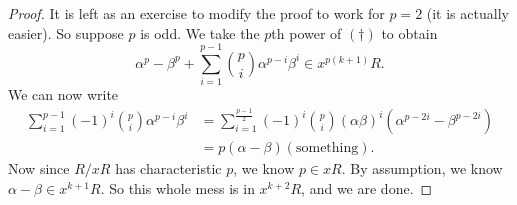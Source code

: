 \documentclass[a4paper]{article}
\begin{document}
\begin{proof}
  It is left as an exercise to modify the proof to work for $p = 2$ (it is actually easier). So suppose $p$ is odd. We take the $p$th power of $(\dagger)$ to obtain
  \[
    \alpha^p - \beta^p + \sum_{i = 1}^{p - 1} \binom{p}{i} \alpha^{p - i} \beta^i \in x^{p(k + 1)}R.
  \]
  We can now write
  \begin{align*}
    \sum_{i = 1}^{p - 1} (-1)^i\binom{p}{i} \alpha^{p - i} \beta^i &= \sum_{i = 1}^{\frac{p - 1}{2}} (-1)^i\binom{p}{i} (\alpha \beta)^i \left(\alpha^{p - 2i} - \beta^{p - 2i}\right)\\
    &= p (\alpha - \beta) (\text{something}).
  \end{align*}
  Now since $R/xR$ has characteristic $p$, we know $p \in xR$. By assumption, we know $\alpha - \beta \in x^{k + 1} R$. So this whole mess is in $x^{k + 2} R$, and we are done.
\end{proof}
\end{document}
